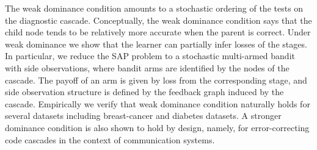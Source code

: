 \documentclass{article}
\begin{document}
The weak dominance condition amounts to a stochastic ordering of the tests on the diagnostic cascade. Conceptually, the weak dominance condition says that the child node tends to be relatively more accurate when the parent is correct.
Under weak dominance we show that the learner can partially infer losses of the stages. In particular, we reduce the SAP problem to a stochastic multi-armed bandit with side observations, where bandit arms are identified by the nodes of the cascade. The payoff of an arm is given by loss from the corresponding stage, and side observation structure is defined by the feedback graph induced by the cascade. Empirically we verify that weak dominance condition naturally holds for several datasets including breast-cancer and diabetes datasets. A stronger dominance condition is also shown to hold by design, namely, for error-correcting code cascades in the context of communication systems.


\end{document}
